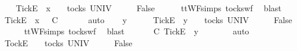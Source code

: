 \begin{isabellebody}
\ \ \isamarkupfalse%
\ {\isachardoublequoteopen}{\isacharbrackleft}Tick{\isacharbrackright}\isactrlsub E\ {\isacharhash}\ x\ {\isacharhash}\ {\isasymrho}\ {\isasymin}\ tocks\ UNIV{\isachardoublequoteclose}\isanewline
\ \ \isamarkupfalse%
\ \isamarkupfalse%
\ {\isachardoublequoteopen}False{\isachardoublequoteclose}\isanewline
\ \ \ \ \isamarkupfalse%
\ ttWF{\isachardot}simps{\isacharparenleft}{}{}{\isacharparenright}\ tocks{\isacharunderscore}wf\ \isamarkupfalse%
\ blast\isanewline
\ \ \isamarkupfalse%
\ \isamarkupfalse%
\ {\isachardoublequoteopen}{\isacharbrackleft}Tick{\isacharbrackright}\isactrlsub E\ {\isacharhash}\ x\ {\isacharhash}\ {\isasymrho}\ {\isasymlesssim}\isactrlsub C\ {\isasymsigma}{\isacharprime}{\isacharprime}{\isachardoublequoteclose}\isanewline
\ \ \ \ \isamarkupfalse%
\ auto\isanewline
{}\isamarkupfalse%
\isanewline
\ \ \isamarkupfalse%
\ y\ {\isasymrho}\ {\isasymsigma}{\isacharprime}{\isacharprime}\isanewline
\ \ \isamarkupfalse%
\ {\isachardoublequoteopen}{\isacharbrackleft}Tick{\isacharbrackright}\isactrlsub E\ {\isacharhash}\ y\ {\isacharhash}\ {\isasymsigma}{\isacharprime}{\isacharprime}\ {\isasymin}\ tocks\ UNIV{\isachardoublequoteclose}\isanewline
\ \ \isamarkupfalse%
\ \isamarkupfalse%
\ {\isachardoublequoteopen}False{\isachardoublequoteclose}\isanewline
\ \ \ \ \isamarkupfalse%
\ ttWF{\isachardot}simps{\isacharparenleft}{}{}{\isacharparenright}\ tocks{\isacharunderscore}wf\ \isamarkupfalse%
\ blast\isanewline
\ \ \isamarkupfalse%
\ \isamarkupfalse%
\ {\isachardoublequoteopen}{\isasymrho}\ {\isasymlesssim}\isactrlsub C\ {\isacharbrackleft}Tick{\isacharbrackright}\isactrlsub E\ {\isacharhash}\ y\ {\isacharhash}\ {\isasymsigma}{\isacharprime}{\isacharprime}{\isachardoublequoteclose}\isanewline
\ \ \ \ \isamarkupfalse%
\ auto\isanewline
{}\isamarkupfalse%
\isanewline
\ \ \isamarkupfalse%
\ {\isasymrho}\ {\isasymsigma}{\isacharprime}{\isacharprime}\isanewline
\ \ \isamarkupfalse%
\ {\isachardoublequoteopen}{\isacharbrackleft}Tock{\isacharbrackright}\isactrlsub E\ {\isacharhash}\ {\isasymrho}\ {\isasymin}\ tocks\ UNIV{\isachardoublequoteclose}\isanewline
\ \ \isamarkupfalse%
\ \isamarkupfalse%
\ {\isachardoublequoteopen}False{\isachardoublequoteclose}\isanewline

\end{isabellebody}
